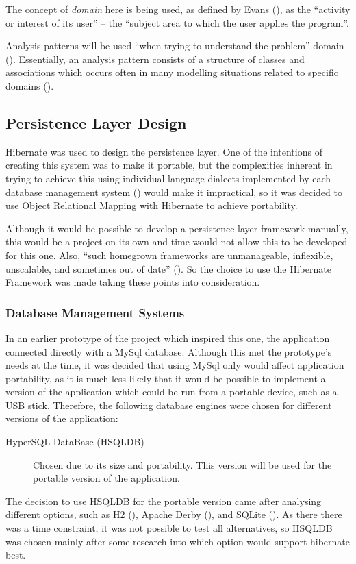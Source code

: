 The concept of \emph{domain} here is being used, as defined by Evans
(\citeyear[][p.~2]{evans2004domain}), as the ``activity or interest of its
user'' -- the ``subject area to which the user applies the program''.

Analysis patterns will be used ``when trying to understand the problem'' domain
(\cite[][Section~1.1]{fowler1997analysis}). Essentially, an analysis pattern
consists of a structure of classes and associations which occurs often in many
modelling situations related to specific domains
(\cite[][p.~254]{bennett2010object}).


\subsection{Persistence Layer Design}
Hibernate was used to design the persistence layer. One of the intentions of
creating this system was to make it portable, but the complexities inherent in
trying to achieve this using individual language dialects implemented by each
database management system (\cite[][p.~4]{bauer2016hibernate}) would make it
impractical, so it was decided to use Object Relational Mapping with Hibernate
to achieve portability.

Although it would be possible to develop a persistence layer framework
manually, this would be a project on its own and time would not allow this to
be developed for this one. Also, ``such homegrown frameworks are unmanageable,
inflexible, unscalable, and sometimes out of date''
(\cite[][p.~7]{konda2014just}). So the choice to use the Hibernate Framework
was made taking these points into consideration.


\subsubsection{Database Management Systems}
In an earlier prototype of the project which inspired this one, the application
connected directly with a MySql database. Although this met the prototype's
needs at the time, it was decided that using MySql only would affect
application portability, as it is much less likely that it would be possible to
implement a version of the application which could be run from a portable
device, such as a USB stick. Therefore, the following database engines were
chosen for different versions of the application:

\begin{description}
  \item[HyperSQL DataBase (HSQLDB)] 
    Chosen due to its size and portability. This version will be used for the
    portable version of the application.
\end{description}

The decision to use HSQLDB for the portable version came after analysing
different options, such as H2 (\cite[][]{mueller2017h2}), Apache Derby
(\cite[][]{apache2017derby}), and SQLite (\cite[][]{hipp2018sqlite}). As there
there was a time constraint, it was not possible to test all alternatives, so
HSQLDB was chosen mainly after some research into which option would support
hibernate best.
